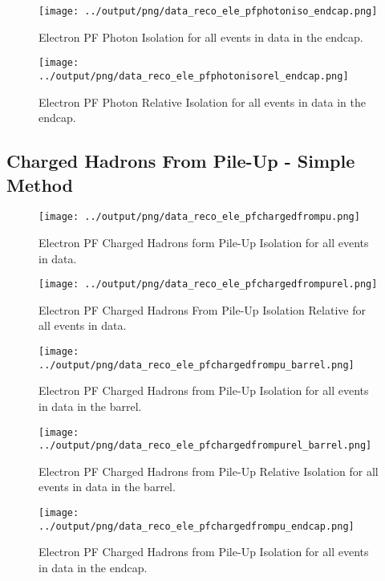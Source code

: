 \documentclass[11pt]{book}
\begin{document}
\begin{figure}[htb]
\centering
\texttt{[image: ../output/png/data\_reco\_ele\_pfphotoniso\_endcap.png]}
\caption{Electron PF Photon Isolation for all events in data in the endcap.}
\label{fig:data_ele_pfphotoniso_endcap}
\end{figure}

\begin{figure}[htb]
\centering
\texttt{[image: ../output/png/data\_reco\_ele\_pfphotonisorel\_endcap.png]}
\caption{Electron PF Photon Relative Isolation for all events in data in the endcap.}
\label{fig:data_ele_pfphotonisorel_endcap}
\end{figure}
\clearpage

\subsection{Charged Hadrons From Pile-Up - Simple Method}
\begin{figure}[htb]
\centering
\texttt{[image: ../output/png/data\_reco\_ele\_pfchargedfrompu.png]}
\caption{Electron PF Charged Hadrons form Pile-Up Isolation for all events in data.}
\label{fig:data_ele_pfchargedfrompu}
\end{figure}

\begin{figure}[htb]
\centering
\texttt{[image: ../output/png/data\_reco\_ele\_pfchargedfrompurel.png]}
\caption{Electron PF Charged Hadrons From Pile-Up Isolation Relative for all events in data.}
\label{fig:data_ele_pfchargedfrompurel}
\end{figure}

\begin{figure}[htb]
\centering
\texttt{[image: ../output/png/data\_reco\_ele\_pfchargedfrompu\_barrel.png]}
\caption{Electron PF Charged Hadrons from Pile-Up Isolation for all events in data in the barrel.}
\label{fig:data_ele_pfchargedfrompu_barrel}
\end{figure}

\begin{figure}[htb]
\centering
\texttt{[image: ../output/png/data\_reco\_ele\_pfchargedfrompurel\_barrel.png]}
\caption{Electron PF Charged Hadrons from Pile-Up Relative Isolation for all events in data in the barrel.}
\label{fig:data_ele_pfchargedfrompurel_barrel}
\end{figure}

\begin{figure}[htb]
\centering
\texttt{[image: ../output/png/data\_reco\_ele\_pfchargedfrompu\_endcap.png]}
\caption{Electron PF Charged Hadrons from Pile-Up Isolation for all events in data in the endcap.}
\label{fig:data_ele_pfchargedfrompu_endcap}
\end{figure}
\end{document}
